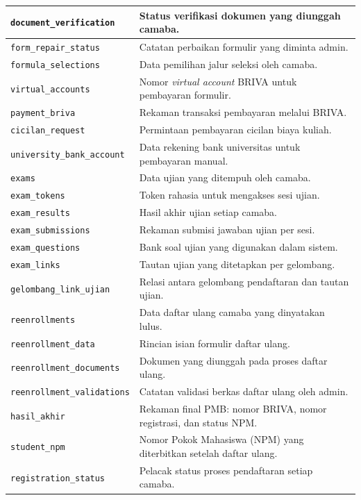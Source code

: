 \begin{longtable}{|L{0.38\textwidth}|L{0.52\textwidth}|}
	\hline
	\texttt{document\_verification} & Status verifikasi dokumen yang diunggah camaba. \\
	\hline
	\texttt{form\_repair\_status} & Catatan perbaikan formulir yang diminta admin. \\
	\hline
	\texttt{formula\_selections} & Data pemilihan jalur seleksi oleh camaba. \\
	\hline
	\texttt{virtual\_accounts} & Nomor \textit{virtual account} BRIVA untuk pembayaran formulir. \\
	\hline
	\texttt{payment\_briva} & Rekaman transaksi pembayaran melalui BRIVA. \\
	\hline
	\texttt{cicilan\_request} & Permintaan pembayaran cicilan biaya kuliah. \\
	\hline
	\texttt{university\_bank\_account} & Data rekening bank universitas untuk pembayaran manual. \\
	\hline
	\texttt{exams} & Data ujian yang ditempuh oleh camaba. \\
	\hline
	\texttt{exam\_tokens} & Token rahasia untuk mengakses sesi ujian. \\
	\hline
	\texttt{exam\_results} & Hasil akhir ujian setiap camaba. \\
	\hline
	\texttt{exam\_submissions} & Rekaman submisi jawaban ujian per sesi. \\
	\hline
	\texttt{exam\_questions} & Bank soal ujian yang digunakan dalam sistem. \\
	\hline
	\texttt{exam\_links} & Tautan ujian yang ditetapkan per gelombang. \\
	\hline
	\texttt{gelombang\_link\_ujian} & Relasi antara gelombang pendaftaran dan tautan ujian. \\
	\hline
	\texttt{reenrollments} & Data daftar ulang camaba yang dinyatakan lulus. \\
	\hline
	\texttt{reenrollment\_data} & Rincian isian formulir daftar ulang. \\
	\hline
	\texttt{reenrollment\_documents} & Dokumen yang diunggah pada proses daftar ulang. \\
	\hline
	\texttt{reenrollment\_validations} & Catatan validasi berkas daftar ulang oleh admin. \\
	\hline
	\texttt{hasil\_akhir} & Rekaman final PMB: nomor BRIVA, nomor registrasi, dan status NPM. \\
	\hline
	\texttt{student\_npm} & Nomor Pokok Mahasiswa (NPM) yang diterbitkan setelah daftar ulang. \\
	\hline
	\texttt{registration\_status} & Pelacak status proses pendaftaran setiap camaba. \\

\end{longtable}
